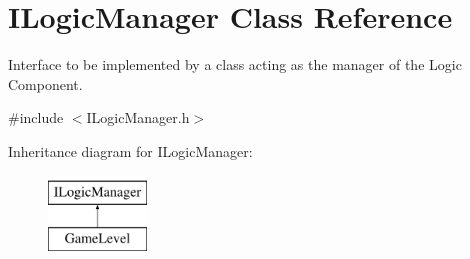 \hypertarget{class_i_logic_manager}{}\section{I\+Logic\+Manager Class Reference}
\label{class_i_logic_manager}


Interface to be implemented by a class acting as the manager of the Logic Component.  




{\ttfamily \#include $<$I\+Logic\+Manager.\+h$>$}

Inheritance diagram for I\+Logic\+Manager\+:\begin{figure}[H]
\begin{center}
\leavevmode
\includegraphics[height=2.000000cm]{class_i_logic_manager}
\end{center}
\end{figure}
